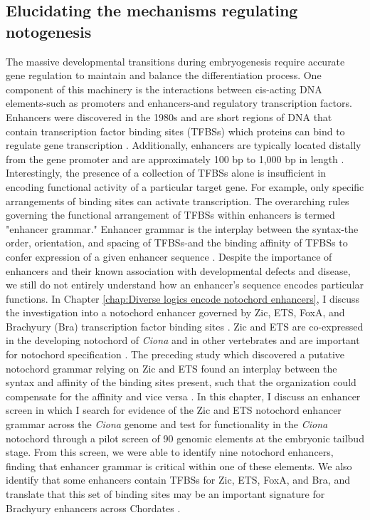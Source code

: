\begin{dissertationintroduction}
    \section{Elucidating the mechanisms regulating notogenesis}

    The massive developmental transitions during embryogenesis require accurate gene regulation to maintain and balance the differentiation process. One component of this machinery is the interactions between cis-acting DNA elements-such as promoters and enhancers-and regulatory transcription factors. Enhancers were discovered in the 1980s and are short regions of DNA that contain transcription factor binding sites (TFBSs) which proteins can bind to regulate gene transcription \cite{khoury1983, kvon2021, levine2010}. Additionally, enhancers are typically located distally from the gene promoter and are approximately 100 bp to 1,000 bp in length \cite{khoury1983, levine2010}. Interestingly, the presence of a collection of TFBSs alone is insufficient in encoding functional activity of a particular target gene. For example, only specific arrangements of binding sites can activate transcription. The overarching rules governing the functional arrangement of TFBSs within enhancers is termed "enhancer grammar." Enhancer grammar is the interplay between the syntax-the order, orientation, and spacing of TFBSs-and the binding affinity of TFBSs to confer expression of a given enhancer sequence \cite{arnone1997, jindal2021}. Despite the importance of enhancers and their known association with developmental defects and disease, we still do not entirely understand how an enhancer’s sequence encodes particular functions. In Chapter \ref{chap:Diverse logics encode notochord enhancers}, I discuss the investigation into a notochord enhancer governed by Zic, ETS, FoxA, and Brachyury (Bra) transcription factor binding sites \cite{farley2016, song2022}. Zic and ETS are co-expressed in the developing notochord of \textit{Ciona} and in other vertebrates and are important for notochord specification \cite{dykes2018,matsumoto2007a}. The preceding study which discovered a putative notochord grammar relying on Zic and ETS found an interplay between the syntax and affinity of the binding sites present, such that the organization could compensate for the affinity and vice versa \cite{farley2016}. In this chapter, I discuss an enhancer screen in which I search for evidence of the Zic and ETS notochord enhancer grammar across the \textit{Ciona} genome and test for functionality in the \textit{Ciona} notochord through a pilot screen of 90 genomic elements at the embryonic tailbud stage. From this screen, we were able to identify nine notochord enhancers, finding that enhancer grammar is critical within one of these elements. We also identify that some enhancers contain TFBSs for Zic, ETS, FoxA, and Bra, and translate that this set of binding sites may be an important signature for Brachyury enhancers across Chordates \cite{song2022}. 
    

\end{dissertationintroduction}

